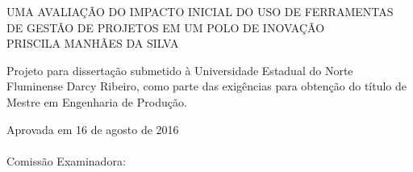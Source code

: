 \begin{folhadeaprovacao}
  \setlength{\ABNTsignthickness}{0.4pt}
  \setlength{\ABNTsignwidth}{15cm}
  \setlength{\ABNTsignskip}{0.9cm}
  \begin{center}
    {\large UMA AVALIAÇÃO DO IMPACTO INICIAL DO USO DE FERRAMENTAS DE GESTÃO DE PROJETOS EM UM POLO DE INOVAÇÃO} \\ [3.5cm]
    {\large PRISCILA MANHÃES DA SILVA} \\ [1.5cm]
    \hspace{.45\textwidth} %
    \begin{minipage}{0.5\textwidth}
      \begin{espacosimples}
        Projeto para dissertação submetido à Universidade Estadual do Norte Fluminense Darcy Ribeiro, como parte das exigências para obtenção do título de Mestre em Engenharia de Produção.
      \end{espacosimples}
    \end{minipage}
  \end{center}
  {\normalsize Aprovada em 16 de agosto de 2016} \\\\
  {\normalsize Comissão Examinadora: }
  \bigbreak
  \bigbreak
  \bigbreak
\end{folhadeaprovacao}
